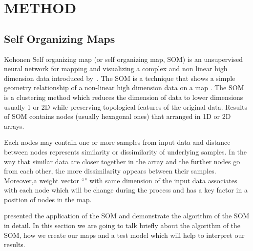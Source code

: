 
\section{METHOD}
\label{sec: method}
 \subsection{Self Organizing Maps}
 \label{sec: som}
 
 Kohonen Self organizing map (or self organizing map, SOM) is an unsupervised neural network for mapping and visualizing a complex and non linear high dimension data introduced by~\citep{Kohonen82}. 
 The SOM is a technique that shows a simple geometry relationship of a non-linear high dimension data on a map \citep{Kohonen98}.
 The SOM is a clustering method which reduces the dimension of data to lower dimensions usually 1 or 2D while preserving topological features of the original data.
 Results of SOM contains nodes (usually hexagonal ones) that arranged in 1D or 2D arrays.
 
  
 Each nodes may contain one or more samples from input data and distance between nodes represents similarity or dissimilarity of underlying samples. 
 In the way that similar data are closer together in the array and the further nodes go from each other, the more dissimilarity appears between their samples.
 Moreover,a weight vector ``" with same dimension of the input data associates with each node which will be change during the process and has a key factor in a position of nodes in the map. 
 
 \cite{Geach12} presented the application of the SOM and demonstrate the algorithm of the SOM in detail. In this section we are going to talk briefly about the algorithm of the SOM, how we create our maps and a test model which will help to interpret our results.
 
